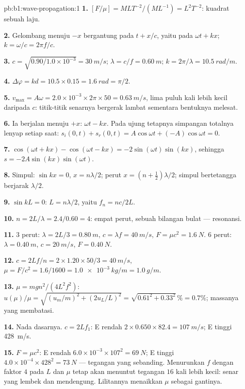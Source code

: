 \begin{solution}{pb:b1:wave-propagation:1}
\textbf{1.} $[F/\mu] = M L T^{-2}/(M L^{-1}) = L^2 T^{-2}$: kuadrat
sebuah laju.

\textbf{2.} Gelombang menuju $-x$ bergantung pada $t + x/c$, yaitu pada
$\omega t + kx$; $k = \omega/c = 2\pi f/c$.

\textbf{3.} $c = \sqrt{0.90/1.0\times10^{-3}} = \qty{30}{m/s}$;
$\lambda = c/f = \qty{0.60}{m}$; $k = 2\pi/\lambda = \qty{10.5}{rad/m}$.

\textbf{4.} $\Delta\varphi = kd = 10.5 \times 0.15 = \qty{1.6}{rad} = \pi/2$.

\textbf{5.} $v_{\max} = A\omega = 2.0\times10^{-3} \times 2\pi \times 50 =
\qty{0.63}{m/s}$, lima puluh kali lebih kecil daripada $c$: titik-titik
senarnya bergerak lambat sementara bentuknya melesat.

\textbf{6.} Ia berjalan menuju $+x$:  $\omega t - kx$. Pada ujung
tetapnya simpangan totalnya lenyap setiap saat: $s_i(0, t) + s_r(0, t)
= A\cos\omega t + (-A)\cos\omega t = 0$.

\textbf{7.} $\cos(\omega t + kx) - \cos(\omega t - kx) =
-2\sin(\omega t)\sin(kx)$, sehingga $s = -2A\sin(kx)\sin(\omega t)$.

\textbf{8.} Simpul: $\sin kx = 0$, $x = n\lambda/2$; perut $x = (n +
\tfrac12)\lambda/2$; simpul bertetangga berjarak $\lambda/2$.

\textbf{9.} $\sin kL = 0$: $L = n\lambda/2$, yaitu $f_n = nc/2L$.

\textbf{10.} $n = 2L/\lambda = 2.4/0.60 = 4$: empat perut, sebuah
bilangan bulat --- resonansi.

\textbf{11.} $3$ perut: $\lambda = 2L/3 = \qty{0.80}{m}$, $c = \lambda f
= \qty{40}{m/s}$, $F = \mu c^2 = \qty{1.6}{N}$. $6$ perut: $\lambda =
\qty{0.40}{m}$, $c = \qty{20}{m/s}$, $F = \qty{0.40}{N}$.

\textbf{12.} $c = 2Lf/n = 2 \times 1.20 \times 50/3 = \qty{40}{m/s}$,
$\mu = F/c^2 = 1.6/1600 = \qty{1.0e-3}{kg/m} = \qty{1.0}{g/m}$.

\textbf{13.} $\mu = mgn^2/(4L^2f^2)$: $u(\mu)/\mu = \sqrt{(u_m/m)^2 +
(2u_L/L)^2} = \sqrt{0.61^2 + 0.33^2}\,\% = 0.7\%$; massanya yang membatasi.

\textbf{14.} Nada dasarnya. $c = 2Lf_1$: E rendah $2 \times 0.650 \times
82.4 = \qty{107}{m/s}$; E tinggi \qty{428}{m/s}.

\textbf{15.} $F = \mu c^2$: E rendah $6.0\times10^{-3} \times 107^2 =
\qty{69}{N}$; E tinggi $4.0\times10^{-4} \times 428^2 = \qty{73}{N}$ ---
tegangan yang sebanding. Menurunkan $f$ dengan faktor $4$ pada $L$ dan
$\mu$ tetap akan menuntut tegangan $16$ kali lebih kecil: senar yang
lembek dan mendengung. Lilitannya menaikkan $\mu$ sebagai gantinya.


\end{solution}
